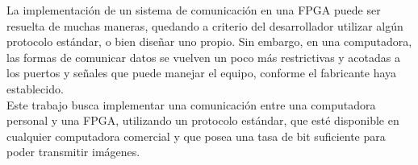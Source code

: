 %
%

La implementación de un sistema de comunicación en una FPGA puede ser resuelta de muchas maneras, quedando a criterio del desarrollador utilizar algún protocolo estándar, o bien diseñar uno propio. Sin embargo, en una computadora, las formas de comunicar datos se vuelven un poco más restrictivas y acotadas a los puertos y señales que puede manejar el equipo, conforme el fabricante haya establecido.\\

Este trabajo busca implementar una comunicación entre una computadora personal y una FPGA, utilizando un protocolo estándar, que esté disponible en cualquier computadora comercial y que posea una tasa de bit suficiente para poder transmitir imágenes.\\


